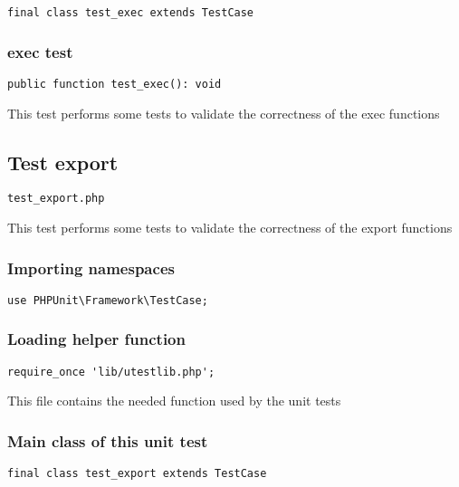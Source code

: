 \documentclass[a4paper]{article}
\begin{document}
\begin{lstlisting}
final class test_exec extends TestCase
\end{lstlisting}

\hypertarget{toc152}{}
\subsubsection{exec test}

\begin{lstlisting}
public function test_exec(): void
\end{lstlisting}

This test performs some tests to validate the correctness
of the exec functions

\hypertarget{toc153}{}
\subsection{Test export}

\begin{lstlisting}
test_export.php
\end{lstlisting}

This test performs some tests to validate the correctness
of the export functions

\hypertarget{toc154}{}
\subsubsection{Importing namespaces}

\begin{lstlisting}
use PHPUnit\Framework\TestCase;
\end{lstlisting}

\hypertarget{toc155}{}
\subsubsection{Loading helper function}

\begin{lstlisting}
require_once 'lib/utestlib.php';
\end{lstlisting}

This file contains the needed function used by the unit tests

\hypertarget{toc156}{}
\subsubsection{Main class of this unit test}

\begin{lstlisting}
final class test_export extends TestCase
\end{lstlisting}
\end{document}
